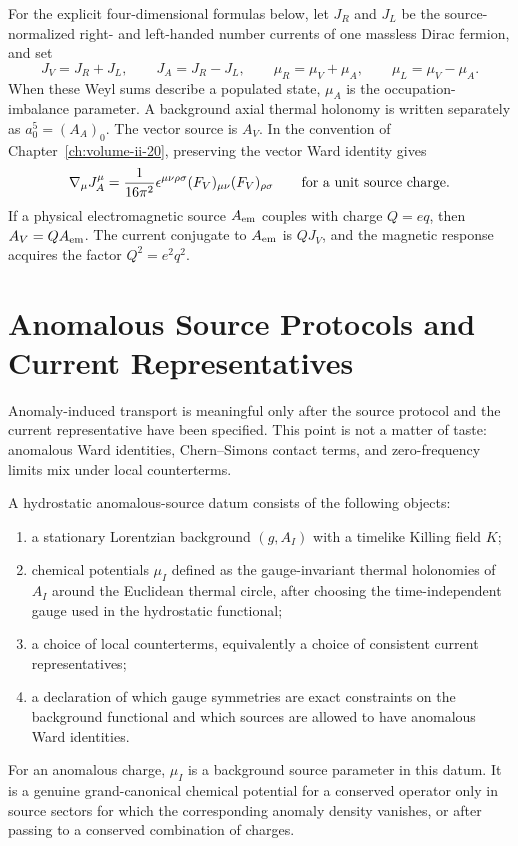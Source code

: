 For the explicit four-dimensional formulas below, let \(J_R\) and \(J_L\) be
the source-normalized right- and left-handed number currents of one massless
Dirac fermion, and set
\[
  J_V=J_R+J_L,\qquad J_A=J_R-J_L,\qquad
  \mu_R=\mu_V+\mu_A,\qquad \mu_L=\mu_V-\mu_A .
\]
When these Weyl sums describe a populated state, \(\mu_A\) is the
occupation-imbalance parameter.  A background axial thermal holonomy is
written separately as \(a_0^5=(A_A)_0\).
The vector source is \(A_V\).  In the convention of
Chapter~\ref{ch:volume-ii-20}, preserving the vector Ward identity gives
\[
  \nabla_\mu J_A^\mu
  =
  \frac1{16\pi^2}
  \epsilon^{\mu\nu\rho\sigma}
  (F_V)_{\mu\nu}(F_V)_{\rho\sigma}
  \qquad
  \hbox{for a unit source charge.}
\]
If a physical electromagnetic source \(A_{\rm em}\) couples with charge
\(Q=eq\), then \(A_V=Q A_{\rm em}\).  The current conjugate to
\(A_{\rm em}\) is \(QJ_V\), and the magnetic response acquires the factor
\(Q^2=e^2q^2\).

\section{Anomalous Source Protocols and Current Representatives}

Anomaly-induced transport is meaningful only after the source protocol and
the current representative have been specified.  This point is not a matter
of taste: anomalous Ward identities, Chern--Simons contact terms, and
zero-frequency limits mix under local counterterms.

\begin{definition}
\label{def:hydrostatic-anomalous-source-datum}
A hydrostatic anomalous-source datum consists of the following objects:
\begin{enumerate}
  \item a stationary Lorentzian background \((g,A_I)\) with a timelike
  Killing field \(K\);
  \item chemical potentials \(\mu_I\) defined as the gauge-invariant thermal
  holonomies of \(A_I\) around the Euclidean thermal circle, after choosing
  the time-independent gauge used in the hydrostatic functional;
  \item a choice of local counterterms, equivalently a choice of consistent
  current representatives;
  \item a declaration of which gauge symmetries are exact constraints on the
  background functional and which sources are allowed to have anomalous Ward
  identities.
\end{enumerate}
For an anomalous charge, \(\mu_I\) is a background source parameter in this
datum.  It is a genuine grand-canonical chemical potential for a conserved
operator only in source sectors for which the corresponding anomaly density
vanishes, or after passing to a conserved combination of charges.
\end{definition}

